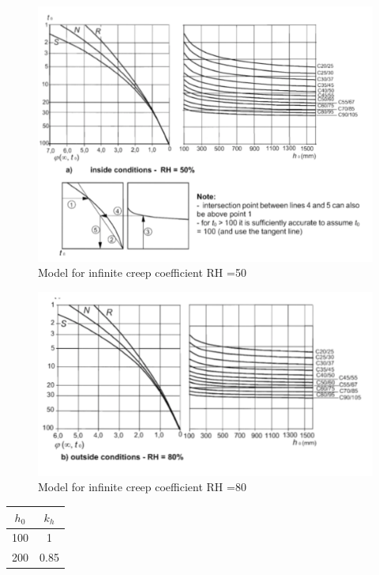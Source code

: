 \documentclass[landscape]{article}
\begin{document}
\begin{multicols*}{2}
    \begin{figure}[H]
        \centering
        \includegraphics[width=0.95\linewidth]{img/phi1}
        \caption{Model for infinite creep coefficient RH =50}
        \label{fig:creep_infinity_1}
    \end{figure}

    \begin{figure}[H]
        \centering
        \includegraphics[width=0.95\linewidth]{img/phi2}
        \caption{Model for infinite creep coefficient RH =80}
        \label{fig:creep_infinity_2}
    \end{figure}

    \begin{table}[H]
    \centering
        \begin{tabular}{cc}
            \toprule
            $h_0$ & $k_h$\tabularnewline
            \midrule
            100 & 1\tabularnewline
            
            200 & 0.85\tabularnewline
            

\end{tabular}
\end{table}
\end{multicols*}
\end{document}
